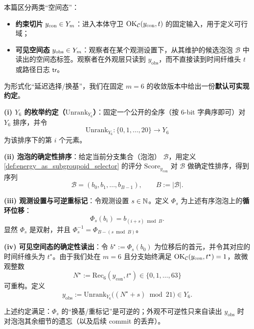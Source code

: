 \begin{definition}\label{def:observer_obs_as_relabeling}
本篇区分两类“空间态”：
\begin{itemize}
  \item \textbf{约束切片} \(y_{\mathrm{con}}\in Y_m\)：进入本体守卫 \(\mathrm{OK}_{\mathcal{C}}(y_{\mathrm{con}},t)\) 的固定输入，用于定义可行域；
  \item \textbf{可见空间态} \(y_{\mathrm{obs}}\in Y_m\)：观察者在某个观测设置下，从其维护的候选泡泡 \(\mathcal B\) 中读出的空间态标签。观察者在外观层只读到 \(y_{\mathrm{obs}}\)，而不直接读到时间纤维头 \(t\) 或路径日志 \(\mathsf{tr}\)。
\end{itemize}
为形式化“延迟选择/换基”，我们在固定 \(m=6\) 的收敛版本中给出一份\textbf{默认可实现约定}。

\textbf{(i) \(Y_6\) 的枚举约定（\(\mathrm{Unrank}_{Y_6}\)）}：固定一个公开的全序（按 6-bit 字典序即可）对 \(Y_6\) 排序，并令
$$
\mathrm{Unrank}_{Y_6}:\{0,1,\dots,20\}\to Y_6
$$
为该排序下的第 \(i\) 个元素。

\textbf{(ii) 泡泡的确定性排序}：给定当前分支集合（泡泡） \(\mathcal B\)，用定义 \ref{def:energy_as_subgroupoid_selector} 的评分 \(\mathrm{Score}_{y_{\mathrm{con}}}\) 对 \(\mathcal B\) 做确定性排序，得到序列
$$
\mathcal B=(b_0,b_1,\dots,b_{B-1}),\qquad B:=|\mathcal B|.
$$

\textbf{(iii) 观测设置与可逆重标记}：令观测设置 \(s\in\mathbb{N}\)。定义 \(\Phi_s\) 为上述有序泡泡上的\textbf{循环位移}：
$$
\Phi_s(b_i)=b_{(i+s)\bmod B}.
$$
显然 \(\Phi_s\) 是双射，并且 \(\Phi_s^{-1}=\Phi_{B-(s\bmod B)}\)。

\textbf{(iv) 可见空间态的确定性读出}：令 \(b^\star:=\Phi_s(b_0)\) 为位移后的首元，并令其对应的时间纤维头为 \(t^\star\)。由于我们处在 \(m=6\) 且分支始终满足 \(\mathrm{OK}_{\mathcal{C}}(y_{\mathrm{con}},t^\star)=1\)，故微观整数
$$
N^\star:=\mathrm{Rec}_6(y_{\mathrm{con}},t^\star)\in\{0,1,\dots,63\}
$$
可重构。定义
$$
y_{\mathrm{obs}}:=\mathrm{Unrank}_{Y_6}\bigl((N^\star+s)\bmod 21\bigr)\in Y_6.
$$

上述约定满足：\(\Phi_s\) 的“换基/重标记”是可逆的；外观不可逆性只来自读出 \(y_{\mathrm{obs}}\) 时对泡泡其余细节的遗忘（以及后续 commit 的丢弃）。
\end{definition}

